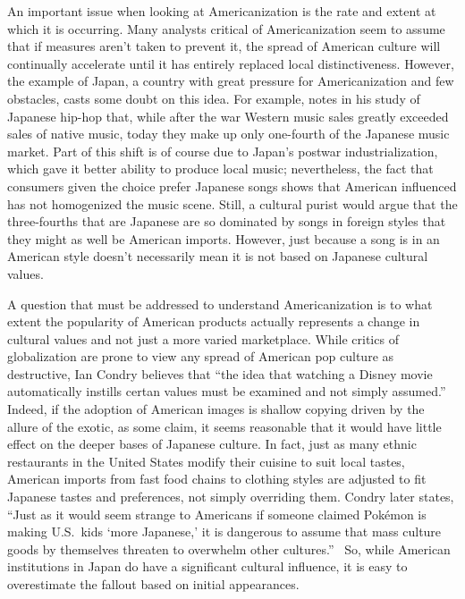 \documentclass[12pt]{article}
\begin{document}
An important issue when looking at Americanization is the rate and extent at which it is occurring.  Many analysts critical of Americanization seem to assume that if measures aren't taken to prevent it, the spread of American culture will continually accelerate until it has entirely replaced local distinctiveness.  However, the example of Japan, a country with great pressure for Americanization and few obstacles, casts some doubt on this idea.  For example, \cHopGlob{\citet[pg.\ 385]} notes in his study of Japanese hip-hop that, while after the war Western music sales greatly exceeded sales of native music, today they make up only one-fourth of the Japanese music market.
Part of this shift is of course due to Japan's postwar industrialization, which gave it better ability to produce local music; nevertheless, the fact that consumers given the choice prefer Japanese songs shows that American influenced has not homogenized the music scene. Still, a cultural purist would argue that the three-fourths that are Japanese are so dominated by songs in foreign styles that they might as well be American imports.  However, just because a song is in an American style doesn't necessarily mean it is not based on Japanese cultural values.

A question that must be addressed to understand Americanization is to what extent the popularity of American products actually represents a change in cultural values and not just a more varied marketplace.  While critics of globalization are prone to view any spread of American pop culture as destructive, Ian Condry believes that
``the idea that watching a Disney movie automatically instills certan values must be examined and not simply assumed.''~\cHopGlob{\citep[pg.\ 382]}
Indeed, if the adoption of American images is shallow copying driven by the allure of the exotic, as some claim, it seems reasonable that it would have little effect on the deeper bases of Japanese culture.  In fact, just as many ethnic restaurants in the United States modify their cuisine to suit local tastes, American imports from fast food chains to clothing styles are adjusted to fit Japanese tastes and preferences, not simply overriding them.  Condry later states,
``Just as it would seem strange to Americans if someone claimed Pok\'emon is making U.S.\ kids `more Japanese,' it is dangerous to assume that mass culture goods by themselves threaten to overwhelm other cultures.''~\cHopGlob{\citep[pg.\ 386]}  So, while American institutions in Japan do have a significant cultural influence, it is easy to overestimate the fallout based on initial appearances.
\end{document}
